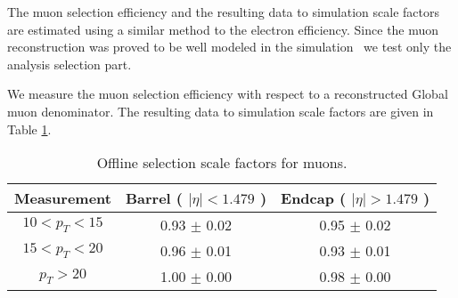 
The muon selection efficiency and the resulting data to simulation
scale factors are estimated using a similar method to the electron efficiency.
Since the muon reconstruction was proved to be well modeled in the simulation~\cite{VBTFCrossSectionNote}
we test only the analysis selection part.

We measure the muon selection efficiency with respect to a reconstructed Global muon
denominator.
The resulting data to simulation scale factors are given in Table \ref{tab:eff_mu_offline}.

\begin{table}[!ht]
\begin{center}
\begin{tabular}{c|c|c}
\hline
Measurement & Barrel ( $|\eta|<1.479$ )   & Endcap ( $|\eta|>1.479$ )  \\ 
\hline
$  10<p_T<  15$ & 0.93 $\pm$ 0.02  & 0.95 $\pm$ 0.02  \\ \hline 
$  15<p_T<  20$ & 0.96 $\pm$ 0.01  & 0.93 $\pm$ 0.01  \\ \hline 
$  p_T>     20$ & 1.00 $\pm$ 0.00  & 0.98 $\pm$ 0.00  \\ \hline 
\end{tabular}
\caption{Offline selection scale factors for muons.}
\label{tab:eff_mu_offline}
\end{center}
\end{table}

